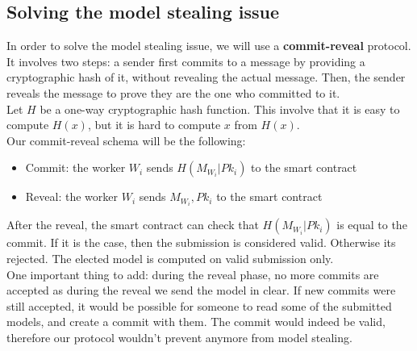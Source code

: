 \documentclass{article}
\begin{document}
\subsection{Solving the model stealing issue}
In order to solve the model stealing issue, we will use a \textbf{commit-reveal} protocol. It involves two steps:
a sender first commits to a message by providing a cryptographic hash of it, without revealing the actual message.
Then, the sender reveals the message to prove they are the one who committed to it.\\
Let $H$ be a one-way cryptographic hash function. This involve that it is easy to compute $H(x)$, but it is hard to
compute $x$ from $H(x)$.\\
Our commit-reveal schema will be the following:
\begin{itemize}
    \item Commit: the worker $W_i$ sends $H(M_{W_i}|Pk_i)$ to the smart contract
    \item Reveal: the worker $W_i$ sends $M_{W_i},Pk_i$ to the smart contract
\end{itemize}
After the reveal, the smart contract can check that $H(M_{W_i}|Pk_i)$ is equal to the commit. If it is the case, then
the submission is considered valid. Otherwise its rejected. The elected model is computed on valid submission only.\\
One important thing to add: during the reveal phase, no more commits are accepted as during the reveal we send
the model in clear. If new commits were still accepted, it would be possible for someone to read some of the submitted
models, and create a commit with them. The commit would indeed be valid, therefore our protocol wouldn't prevent anymore
from model stealing.
\end{document}

